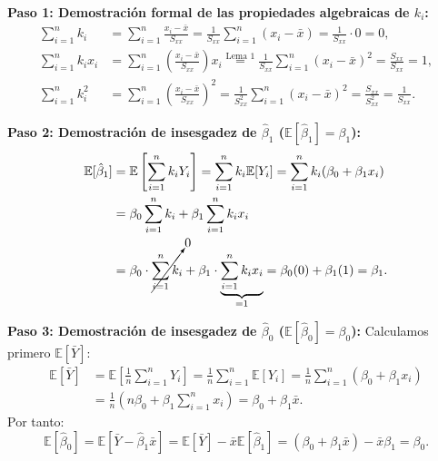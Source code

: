 \documentclass[11pt,a4paper]{article}
\begin{document}
\begin{demobox}
\textbf{Paso 1: Demostración formal de las propiedades algebraicas de $k_i$:}
\begin{align}
\sum_{i=1}^n k_i &= \sum_{i=1}^n \frac{x_i - \bar{x}}{S_{xx}} = \frac{1}{S_{xx}}\sum_{i=1}^n (x_i - \bar{x}) = \frac{1}{S_{xx}} \cdot 0 = 0, \label{eq:prop_k1} \\[0.5em]
\sum_{i=1}^n k_i x_i &= \sum_{i=1}^n \left(\frac{x_i - \bar{x}}{S_{xx}}\right)x_i \overset{\text{Lema 1}}{=} \frac{1}{S_{xx}}\sum_{i=1}^n (x_i - \bar{x})^2 = \frac{S_{xx}}{S_{xx}} = 1, \label{eq:prop_k2} \\[0.5em]
\sum_{i=1}^n k_i^2 &= \sum_{i=1}^n \left(\frac{x_i - \bar{x}}{S_{xx}}\right)^2 = \frac{1}{S_{xx}^2}\sum_{i=1}^n (x_i - \bar{x})^2 = \frac{S_{xx}}{S_{xx}^2} = \frac{1}{S_{xx}}. \label{eq:prop_k3}
\end{align}

\textbf{Paso 2: Demostración de insesgadez de $\hat{\beta}_1$ ($\mathbb{E}[\hat{\beta}_1] = \beta_1$):}
\begin{align}
\mathbb{E}[\hat{\beta}_1] &= \mathbb{E}\left[ \sum_{i=1}^n k_i Y_i \right] = \sum_{i=1}^n k_i \mathbb{E}[Y_i] = \sum_{i=1}^n k_i (\beta_0 + \beta_1 x_i) \\
&= \beta_0 \sum_{i=1}^n k_i + \beta_1 \sum_{i=1}^n k_i x_i \\
&= \beta_0 \cdot \cancelto{0}{\sum_{i=1}^n k_i} + \beta_1 \cdot \underbrace{\sum_{i=1}^n k_i x_i}_{= 1} = \beta_0(0) + \beta_1(1) = \beta_1.
\end{align}

\textbf{Paso 3: Demostración de insesgadez de $\hat{\beta}_0$ ($\mathbb{E}[\hat{\beta}_0] = \beta_0$):}  
Calculamos primero $\mathbb{E}[\bar{Y}]$:
\begin{align}
\mathbb{E}[\bar{Y}] &= \mathbb{E}\left[ \frac{1}{n}\sum_{i=1}^n Y_i \right] = \frac{1}{n}\sum_{i=1}^n \mathbb{E}[Y_i] = \frac{1}{n}\sum_{i=1}^n (\beta_0 + \beta_1 x_i) \\
&= \frac{1}{n}\left( n\beta_0 + \beta_1 \sum_{i=1}^n x_i \right) = \beta_0 + \beta_1 \bar{x}.
\end{align}
Por tanto:
\begin{equation}
\mathbb{E}[\hat{\beta}_0] = \mathbb{E}[\bar{Y} - \hat{\beta}_1 \bar{x}] = \mathbb{E}[\bar{Y}] - \bar{x}\mathbb{E}[\hat{\beta}_1] = (\beta_0 + \beta_1 \bar{x}) - \bar{x}\beta_1 = \beta_0.
\end{equation}


\end{demobox}
\end{document}
